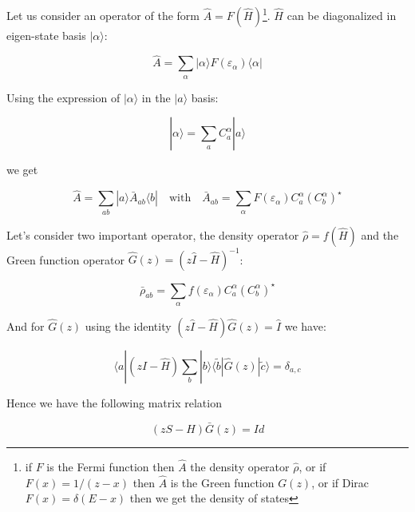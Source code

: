 \documentclass{article}
\newcommand{\bra}[1]{\langle #1|}
\newcommand{\ket}[1]{|#1\rangle}
\newcommand{\op}[1]{\hat{#1}}
\begin{document}

\smallskip
\noindent
Let us consider an operator of the form
$\op{A}=F(\op{H})$\footnote{if $F$ is the Fermi function then
 $\op{A}$ the density operator $\op{\rho}$, or if $F(x)=1/(z-x)$ then  $\op{A}$ is the Green function $G(z)$, or if  Dirac $F(x)=\delta(E-x)$ then we get the density of states}.  $\op{H}$ can be diagonalized in eigen-state basis $\ket{\alpha}$:

\[ \op{A}=\sum_{\alpha} \ket{\alpha} F(\varepsilon_{\alpha}) \bra{\alpha} \]

\noindent
Using the expression of $\ket{\alpha}$ in the $\ket{a}$ basis:

\[\ket{\alpha}=\sum_a C_a^{\alpha}\ket{a}  \]
\noindent


\noindent
we get


\[ \op{A}= \sum_{ab} \ket{a}\bar{A}_{ab} \bra{b} \quad \text{with} \quad 
\bar{A}_{ab}=
\sum_{\alpha} F(\varepsilon_{\alpha})C_a^{\alpha}(C_{b}^{\alpha})^{\star} \]

\noindent
Let's consider two important operator, the density operator $\op{\rho}=f(\op{H})$ and the Green function operator $\op{G}(z)=(z\op{I}-\op{H})^{-1}$:

\noindent
\[ \bar{\rho}_{ab}=
\sum_{\alpha} f(\varepsilon_{\alpha})C_a^{\alpha}(C_{b}^{\alpha})^{\star} \]

\noindent
And for $\op{G}(z)$ using the identity $(z\op{I}-\op{H})\op{G}(z)=\op{I}$ we have:

\[ \bra{a}(z\op{I}-\op{H})\sum_b \ket{b}\bra{\tilde{b}}\op{G}(z) \ket{\tilde{c}}=\delta_{a,c}\]

\noindent
Hence we have the following matrix relation

\[(zS-H)\bar{G}(z)=Id\]



\noindent


\end{document}
